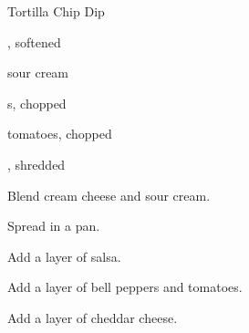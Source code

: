\begin{recipe}{Tortilla Chip Dip}{}{}

\begin{ingredients}
\item {} , softened
\item \C{\half} sour cream
\item {}
\item {}s, chopped
\item tomatoes, chopped
\item {}, shredded
\end{ingredients}

\begin{directions}
\item Blend cream cheese and sour cream.
\item Spread in a pan.
\item Add a layer of salsa.
\item Add a layer of bell peppers and tomatoes.
\item Add a layer of cheddar cheese.
\end{directions}

\end{recipe}
